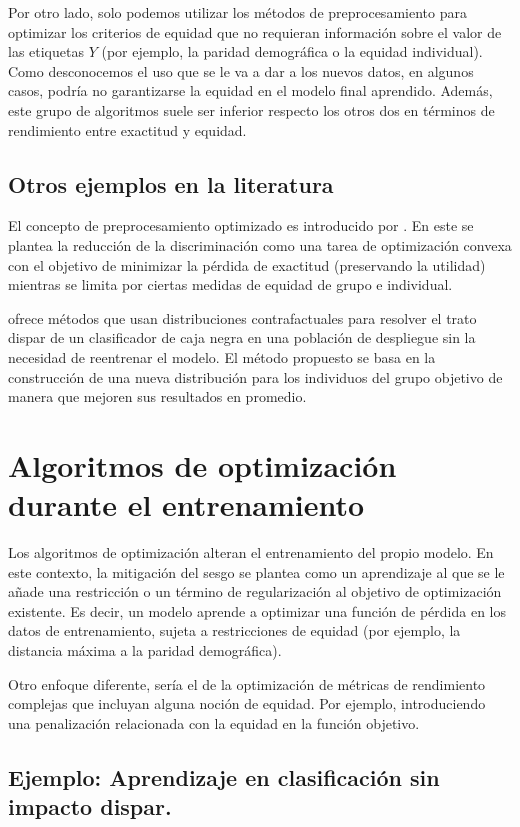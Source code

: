 \documentclass[oneside,openright,titlepage,numbers=noenddot,openany,headinclude,footinclude=true,
cleardoublepage=empty,abstractoff,BCOR=5mm,paper=a4,fontsize=12pt,main=spanish]{scrreprt}
\begin{document}
Por otro lado, solo podemos utilizar los métodos de preprocesamiento para optimizar los criterios de equidad que no requieran información sobre el valor de las etiquetas $Y$ (por ejemplo, la paridad demográfica o la equidad individual). Como desconocemos el uso que se le va a dar a los nuevos datos, en algunos casos, podría no garantizarse la equidad en el modelo final aprendido. Además, este grupo de algoritmos suele ser inferior respecto los otros dos en términos de rendimiento entre exactitud y equidad.


\subsection*{Otros ejemplos en la literatura}

El concepto de preprocesamiento optimizado es introducido por \cite{optimizeddata2017}. En este se plantea la reducción de la discriminación como una tarea de optimización convexa con el objetivo de minimizar la pérdida de exactitud (preservando la utilidad) mientras se limita por ciertas medidas de equidad de grupo e individual.

\cite{repairing2019} ofrece métodos que usan distribuciones contrafactuales para resolver el trato dispar de un clasificador de caja negra en una población de despliegue sin la necesidad de reentrenar el modelo. El método propuesto se basa en la construcción de una nueva distribución para los individuos del grupo objetivo de manera que mejoren sus resultados en promedio.

\section{Algoritmos de optimización durante el entrenamiento}

Los algoritmos de optimización alteran el entrenamiento del propio modelo. En este contexto, la mitigación del sesgo se plantea como un aprendizaje al que se le añade una restricción o un término de regularización al objetivo de optimización existente. Es decir, un modelo aprende a optimizar una función de pérdida en los datos de entrenamiento, sujeta a restricciones de equidad (por ejemplo, la distancia máxima a la paridad demográfica).

Otro enfoque diferente, sería el de la optimización de métricas de rendimiento complejas que incluyan alguna noción de equidad. Por ejemplo, introduciendo una penalización relacionada con la equidad en la función objetivo.

\subsection{Ejemplo: Aprendizaje en clasificación sin impacto dispar.}
\end{document}
